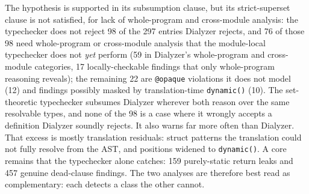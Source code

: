 The hypothesis is supported in its subsumption clause, but its strict-superset clause is not satisfied, for lack of whole-program and cross-module analysis: the typechecker does not reject 98 of the 297 entries Dialyzer rejects, and 76 of those 98 need whole-program or cross-module analysis that the module-local typechecker does not \emph{yet} perform (59 in Dialyzer's whole-program and cross-module categories, 17 locally-checkable findings that only whole-program reasoning reveals); the remaining 22 are \texttt{@opaque} violations it does not model (12) and findings possibly masked by translation-time \texttt{dynamic()} (10).
The set-theoretic typechecker subsumes Dialyzer wherever both reason over the same resolvable types, and none of the 98 is a case where it wrongly accepts a definition Dialyzer soundly rejects.
It also warns far more often than Dialyzer.
That excess is mostly translation residuals: struct patterns the translation could not fully resolve from the AST, and positions widened to \texttt{dynamic()}. A core remains that the typechecker alone catches: 159 purely-static return leaks and 457 genuine dead-clause findings.
The two analyses are therefore best read as complementary: each detects a class the other cannot.

